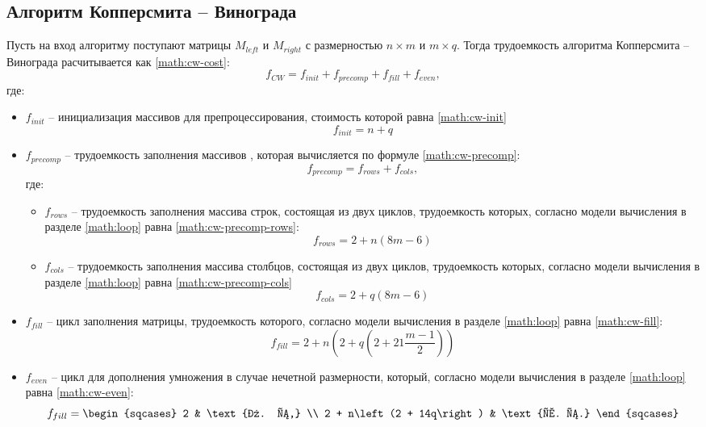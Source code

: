 \subsection{Алгоритм Копперсмита -- Винограда}\label{win-estimate}
Пусть на вход алгоритму поступают матрицы $M_{left}$ и $M_{right}$ с размерностью $n \times m$ и $m \times q$. Тогда трудоемкость алгоритма Копперсмита -- Винограда расчитывается как \ref{math:cw-cost}:
\begin{equation}\label{math:cw-cost}
	f_{CW} = f_{init} + f_{precomp} + f_{fill} + f_{even},
\end{equation}
где:
\begin{itemize}
	\item $f_{init}$ -- инициализация массивов для препроцессирования, стоимость которой равна \ref{math:cw-init}
	\begin{equation}\label{math:cw-init}
		f_{init} = n + q
	\end{equation} 
	\item $f_{precomp}$ -- трудоемкость заполнения массивов , которая вычисляется по формуле \ref{math:cw-precomp}:
		\begin{equation}\label{math:cw-precomp}
		f_{precomp} = f_{rows} + f_{cols},
	\end{equation} 
	где:
	\begin{itemize}
		\item $f_{rows}$ -- трудоемкость заполнения массива строк, состоящая из двух циклов, трудоемкость которых, согласно модели вычисления в разделе \ref{math:loop} равна \ref{math:cw-precomp-rows}:
		 \begin{equation}\label{math:cw-precomp-rows}
		 	f_{rows} = 2 + n\left(8m - 6\right)
		 \end{equation}
		\item $f_{cols}$ -- трудоемкость заполнения массива столбцов, состоящая из двух циклов, трудоемкость которых, согласно модели вычисления в разделе \ref{math:loop} равна \ref{math:cw-precomp-cols}
		\begin{equation}\label{math:cw-precomp-cols}
			f_{cols} = 2 + q\left(8m - 6\right)
		\end{equation}
	\end{itemize}
	\item $f_{fill}$ -- цикл заполнения матрицы, трудоемкость которого, согласно модели вычисления в разделе \ref{math:loop} равна \ref{math:cw-fill}:
	\begin{equation}\label{math:cw-fill}
		f_{fill} = 2 + n\left(2 + q\left(2 + 21\dfrac{m - 1}{2}\right)\right)
	\end{equation}
	\item $f_{even}$ -- цикл для дополнения умножения в случае нечетной размерности, который, согласно модели вычисления в разделе \ref{math:loop} равна \ref{math:cw-even}:
	\begin{equation}\label{math:cw-even}
		f_{fill} = 
		\begin{sqcases}
			2 & \text{л. с,} \\ 
			2 + n\left(2 + 14q\right) & \text{х. с.}
		\end{sqcases}
	\end{equation}
\end{itemize}

